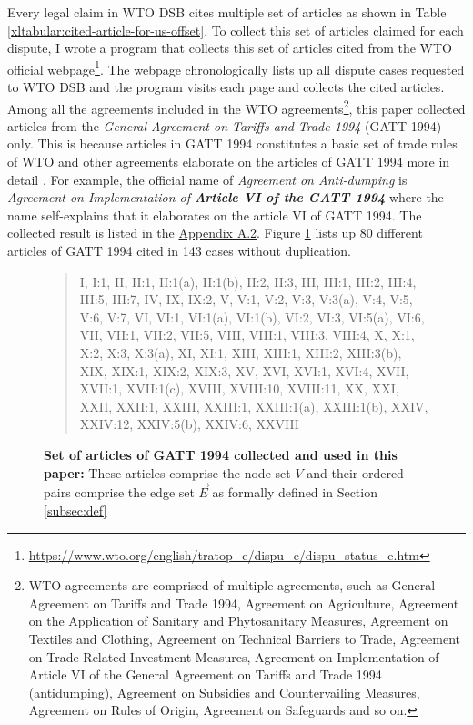 Every legal claim in WTO DSB
cites multiple set of articles
as shown in Table
\ref{xltabular:cited-article-for-us-offset}.
To collect this set of articles claimed for each dispute, I wrote a program that collects this set of articles cited from the WTO official webpage\footnote{\url{https://www.wto.org/english/tratop_e/dispu_e/dispu_status_e.htm}}.
The webpage chronologically lists up all dispute cases
requested to WTO DSB and the program visits each page
and collects the cited articles. Among all the agreements included in the WTO agreements\footnote{
   WTO agreements are comprised of multiple agreements, such as
   General Agreement on Tariffs and Trade 1994,
   Agreement on Agriculture,
   Agreement on the Application of Sanitary and Phytosanitary Measures,
   Agreement on Textiles and Clothing,
   Agreement on Technical Barriers to Trade,
   Agreement on Trade-Related Investment Measures,
   Agreement on Implementation of Article VI of the General Agreement on Tariffs and Trade 1994 (antidumping),
   Agreement on Subsidies and Countervailing Measures,
   Agreement on Rules of Origin,
   Agreement on Safeguards and so on.
   },
this paper collected articles from the \textit{General Agreement on Tariffs and Trade 1994} (GATT 1994) only.
This is because articles in GATT 1994 constitutes a basic set of trade rules of WTO and other agreements elaborate on the articles of GATT 1994 more in detail \citep{world1999wto}. For example, the official name of \textit{Agreement on Anti-dumping}
is \textit{Agreement on Implementation of \textbf{Article VI of the GATT 1994}}
where the name self-explains that it elaborates on the article VI of GATT 1994.
The collected result is listed in the \hyperref[sub:cited-articles-table]{Appendix A.2}. Figure \ref{fig:set-of-articles-used}
lists up 80 different articles of GATT 1994 cited in 143 cases without duplication.

 
\begin{figure}[t!]
   \begin{quote}
   I,
   I:1,
   II,
   II:1,
   II:1(a),
   II:1(b),
   II:2,
   II:3,
   III,
   III:1,
   III:2,
   III:4,
   III:5,
   III:7,
   IV,
   IX,
   IX:2,
   V,
   V:1,
   V:2,
   V:3,
   V:3(a),
   V:4,
   V:5,
   V:6,
   V:7,
   VI,
   VI:1,
   VI:1(a),
   VI:1(b),
   VI:2,
   VI:3,
   VI:5(a),
   VI:6,
   VII,
   VII:1,
   VII:2,
   VII:5,
   VIII,
   VIII:1,
   VIII:3,
   VIII:4,
   X,
   X:1,
   X:2,
   X:3,
   X:3(a),
   XI,
   XI:1,
   XIII,
   XIII:1,
   XIII:2,
   XIII:3(b),
   XIX,
   XIX:1,
   XIX:2,
   XIX:3,
   XV,
   XVI,
   XVI:1,
   XVI:4,
   XVII,
   XVII:1,
   XVII:1(c),
   XVIII,
   XVIII:10,
   XVIII:11,
   XX,
   XXI,
   XXII,
   XXII:1,
   XXIII,
   XXIII:1,
   XXIII:1(a),
   XXIII:1(b),
   XXIV,
   XXIV:12,
   XXIV:5(b),
   XXIV:6,
   XXVIII
   \end{quote}
   \caption{
       \textbf{
           Set of articles of GATT 1994 collected and used in this paper:
           }These articles comprise the node-set $V$ and their ordered pairs comprise the edge set $\vec{E}$ as formally defined in Section \ref{subsec:def}
       }
   \label{fig:set-of-articles-used}
\end{figure}
  
